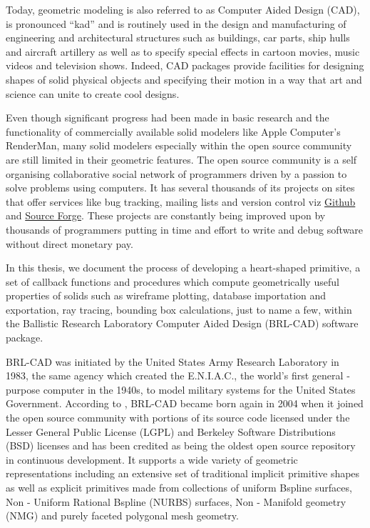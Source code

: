 \hspace{30}Today, geometric modeling is also referred to as Computer ­Aided Design
(CAD), is pronounced “kad” and is routinely used in the design and
manufacturing of engineering and architectural structures such as buildings, car  
parts, ship hulls and aircraft artillery as well as to specify special effects in  
cartoon movies, music videos and television shows. Indeed, CAD packages
provide facilities for designing shapes of solid physical objects and specifying
their motion in a way that art and science can unite to create cool designs.  

\hspace{30} Even though significant progress had been made in basic research and
the functionality of commercially available solid modelers like Apple
Computer's RenderMan, many solid modelers especially within the open
source community are still limited in their geometric features. The open
source community is a self organising collaborative social network of 
programmers driven by a passion to solve problems using computers.
It has several thousands of its projects on sites that offer services 
like bug tracking, mailing lists and version control viz \href{https://github.com/}{Github} 
and \href{http://sourceforge.net}{Source Forge}. These projects are constantly 
being improved upon by thousands of programmers putting in time and effort 
to write and debug software without direct monetary pay.

\hspace{30} In this thesis, we document the process of developing a heart­-shaped
primitive, a set of callback functions and procedures which compute geometrically 
useful properties of solids such as wireframe plotting, database importation and 
exportation, ray tracing, bounding box calculations, just to name a few, within the
 Ballistic Research Laboratory Computer Aided Design (BRL-­CAD) software package.  

\hspace{30} BRL-­CAD was initiated by the United States Army Research Laboratory
in 1983, the same agency which created the E.N.I.A.C., the world's first 
general ­purpose computer in the 1940s, to model military systems for the
United States Government. According to \cite{3}, BRL-­CAD became born again in 
2004 when it joined the open source community with portions of its source
code licensed under the Lesser General Public License (LGPL) and Berkeley
Software Distributions (BSD) licenses and has been credited as being the
oldest open source repository in continuous development. It supports a wide
variety of geometric representations including an extensive set of traditional
implicit primitive shapes as well as explicit primitives made from collections of
uniform B­spline surfaces, Non - ­Uniform Rational B­spline (NURBS) surfaces,  
Non­ - Manifold geometry (NMG) and purely faceted polygonal mesh geometry.  


